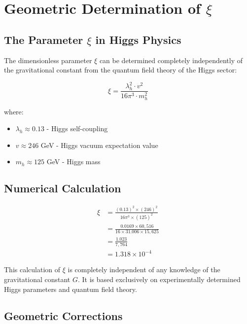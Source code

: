 \documentclass[12pt,a4paper]{article}
\begin{document}
	\section{Geometric Determination of $\xi$}
	
	\subsection{The Parameter $\xi$ in Higgs Physics}
	
	The dimensionless parameter $\xi$ can be determined completely independently of the gravitational constant from the quantum field theory of the Higgs sector:
	
	\begin{equation}
		\xi = \frac{\lambda_h^2 \cdot v^2}{16\pi^3 \cdot m_h^2}
	\end{equation}
	
	where:
	\begin{itemize}
		\item $\lambda_h \approx 0.13$ - Higgs self-coupling
		\item $v \approx 246$ GeV - Higgs vacuum expectation value  
		\item $m_h \approx 125$ GeV - Higgs mass
	\end{itemize}
	
	\subsection{Numerical Calculation}
	
	\begin{align}
		\xi &= \frac{(0.13)^2 \times (246)^2}{16\pi^3 \times (125)^2}\\
		&= \frac{0.0169 \times 60{,}516}{16 \times 31.006 \times 15{,}625}\\
		&= \frac{1.023}{7{,}764}\\
		&= 1.318 \times 10^{-4}
	\end{align}
	
	\begin{tcolorbox}[colback=green!5!white,colframe=green!75!black,title=Important Point]
		This calculation of $\xi$ is completely independent of any knowledge of the gravitational constant $G$. It is based exclusively on experimentally determined Higgs parameters and quantum field theory.
	\end{tcolorbox}
	
	\subsection{Geometric Corrections}
	
\end{document}
